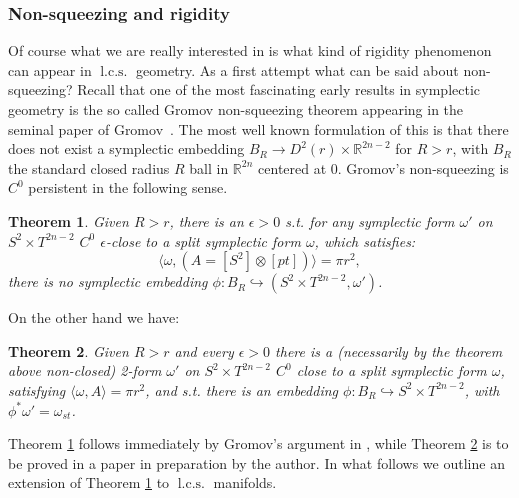 \documentclass{amsart}
\numberwithin{equation}{section}
\newtheorem{theorem}{Theorem}
\theoremstyle{definition}
\theoremstyle{remark}
\DeclareMathOperator{\lcs}{l.c.s.}
\begin{document}
\subsubsection {Non-squeezing and rigidity}
Of course what we are really interested in is what kind of rigidity phenomenon can appear in $\lcs$ geometry. As a first attempt what can be said about non-squeezing? Recall that one of the most fascinating early results in symplectic geometry is the so called Gromov non-squeezing theorem appearing in the seminal paper of Gromov~\cite{citeGromovPseudoholomorphiccurvesinsymplecticmanifolds.}.
The most well known formulation of this is that there does not exist a  symplectic embedding $B _{R} \to D ^{2} (r)  \times \mathbb{R} ^{2n-2}   $ for $R>r$, with $ B _{R}  $ the standard closed radius $R$ ball 
in $\mathbb{R} ^{2n} $ centered at $0$.
Gromov's non-squeezing is $C ^{0} $ persistent in the following sense.      
\begin{theorem} \label{thm:Gromov1} Given $R>r$, there is an $\epsilon>0$ s.t. for any symplectic form $\omega' $ on $S ^{2} \times T ^{2n-2}  $ $C ^{0} $ $\epsilon$-close to a split symplectic form $\omega$, which satisfies: $$ \langle \omega, (A=[S ^{2} ] \otimes [pt])  \rangle = \pi r ^{2},  $$  there is no symplectic embedding $\phi: B _{R} \hookrightarrow (S ^{2} \times T ^{2n-2}, \omega')   $.
\end{theorem}
 On the other hand we have: 
\begin{theorem} \label{thm:nonrigidity} Given $R>r$ and every $\epsilon > 0 $  there is
a (necessarily by the theorem above non-closed) 2-form $\omega'$ on $S ^{2} \times T ^{2n-2}  $  $C ^{0} $ close to a split symplectic form $\omega $, satisfying $ \langle \omega, A  \rangle = \pi r ^{2}  $, and s.t. there is an embedding $\phi: B _{R} \hookrightarrow S ^{2} \times T ^{2n-2}   $, with $\phi ^{*}\omega'=\omega _{st}  $.
\end{theorem}
 Theorem \ref{thm:Gromov1} follows immediately by Gromov's argument in \cite{citeGromovPseudoholomorphiccurvesinsymplecticmanifolds.}, while Theorem \ref{thm:nonrigidity} is to be proved in a paper in preparation by the author. In what follows we outline an extension of Theorem \ref{thm:Gromov1} to $\lcs$ manifolds.
\end{document}
